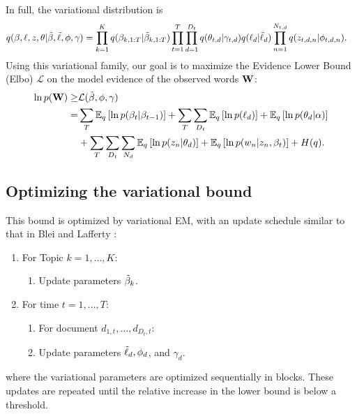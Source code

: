 In full, the variational distribution is
\begin{align}
  q(\beta, \ell, z, \theta | & \tilde{\beta}, \tilde{\ell}, \phi, \gamma) = \prod_{k=1}^K q(\beta_{k,1:T} | \tilde{\beta}_{k,1:T})
  \prod_{t=1}^T \prod_{d=1}^{D_t} q(\theta_{t,d} | \gamma_{t,d})
  q(\ell_{d} | \tilde{\ell}_{d})
  \prod_{n=1}^{N_{t,d}} q(z_{t,d,n} | \phi_{t,d,n}). \nonumber
\end{align}
Using this variational family, our goal is to maximize the Evidence Lower Bound (Elbo) $\mathcal{L}$ on the model evidence of the observed words $\textbf{W}$:
\begin{align}
  \label{eq:elbo}
  \ln p(\textbf{W}) \geq & \mathcal{L}(\tilde{\beta}, \phi, \gamma) \\ \nonumber
  = & \sum_T \mathbb{E}_q\left[\ln p(\beta_{t} | \beta_{t-1})\right] 
  + \sum_{T} \sum_{D_t} \mathbb{E}_q\left[\ln p(\ell_{d})\right] + \mathbb{E}_q\left[\ln p(\theta_{d} | \alpha)\right] \\ \nonumber
  & + \sum_{T} \sum_{D_t} \sum_{N_d} \mathbb{E}_q\left[\ln p( z_n | \theta_d)\right] + \mathbb{E}_q\left[\ln p(w_n | z_n, \beta_t)\right]
  + H(q). \nonumber
\end{align}

\subsection*{Optimizing the variational bound}
This bound is optimized by variational EM, with an update schedule similar to that in Blei and Lafferty \cite{blei:2006}:
\begin{enumerate}
\item For Topic $k=1, \ldots, K$:
  \begin{enumerate}
  \item Update parameters $\tilde{\beta}_k$.
  \end{enumerate}
\item For time $t = 1, \ldots, T$:
  \begin{enumerate}
  \item For document $d_{1,t}, \ldots, d_{{D_t}, t}$:
  \item Update parameters $\tilde{\ell}_d, \phi_d$, and $\gamma_d$.
    \end{enumerate}
  \end{enumerate}    
where the variational parameters are optimized sequentially in
blocks.  These updates are repeated until the relative increase in
the lower bound is below a threshold.

